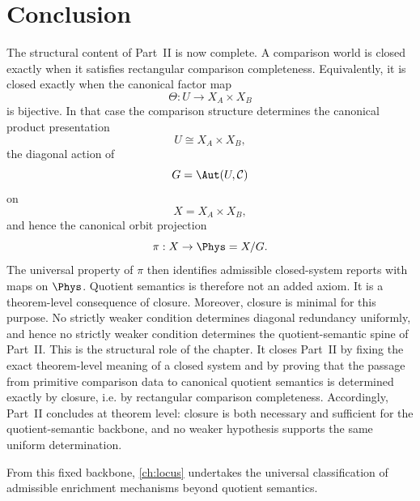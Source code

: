 \section{Conclusion}
\label{sec:closure-conclusion}
The structural content of Part~II is now complete.
A comparison world is closed exactly when it satisfies rectangular
comparison completeness. Equivalently, it is closed exactly when the
canonical factor map
\[
	\Theta:U\to X_A\times X_B
\]
is bijective. In that case the comparison structure determines the canonical
product presentation
\[
	U\cong X_A\times X_B,
\]
the diagonal action of
\[
	G=\Aut(U,\mathcal C)
\]
on
\[
	X=X_A\times X_B,
\]
and hence the canonical orbit projection
\[
	\pi:X\to\Phys=X/G.
\]
The universal property of \(\pi\) then identifies admissible
closed-system reports with maps on \(\Phys\). Quotient semantics is
therefore not an added axiom. It is a theorem-level consequence of
closure.
	Moreover, closure is minimal for this purpose. No strictly weaker
	condition determines diagonal redundancy uniformly, and hence no strictly
	weaker condition determines the quotient-semantic spine of Part~II.
	This is the structural role of the chapter. It closes Part~II by fixing
	the exact theorem-level meaning of a closed system and by proving that
	the passage from primitive comparison data to canonical quotient
	semantics is determined exactly by closure, i.e. by rectangular
	comparison completeness.
	Accordingly, Part~II concludes at theorem level: closure is both
	necessary and sufficient for the quotient-semantic backbone, and no
	weaker hypothesis supports the same uniform determination.

From this fixed backbone, \cref{ch:locus} undertakes the universal
classification of admissible enrichment mechanisms beyond quotient
semantics.